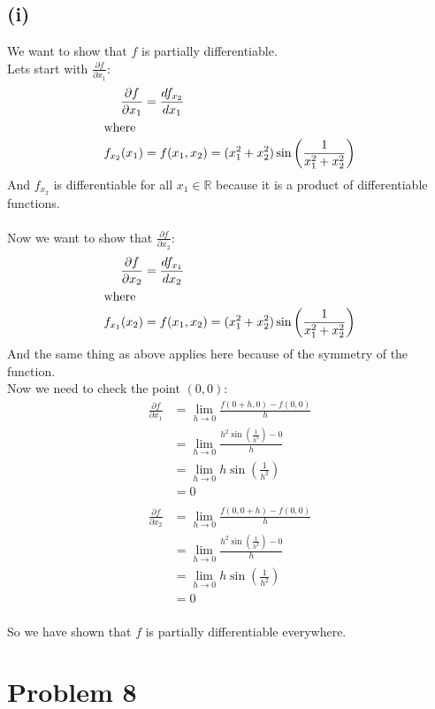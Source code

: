 \documentclass{article}
\begin{document}
\subsection*{(i)}
We want to show that \(f\) is partially differentiable. \\
Lets start with \(\frac{\partial f}{\partial x_1}\):
\begin{align*}
   \frac{\partial f}{\partial x_1} &= \frac{df_{x_2}}{dx_1} \\
   \intertext{where}
   f_{x_2}(x_1) &= f(x_1, x_2) = (x_1^2 + x_2^2) \sin\left(\frac{1}{x_1^2 + x_2^2}\right)
\end{align*}
And \(f_{x_2}\) is differentiable for all \(x_1 \in \mathbb{R}\) because it is a product of differentiable functions. \\
\\
Now we want to show that \(\frac{\partial f}{\partial x_2}\):
\begin{align*}
   \frac{\partial f}{\partial x_2} &= \frac{df_{x_1}}{dx_2} \\
   \intertext{where}
   f_{x_1}(x_2) &= f(x_1, x_2) = (x_1^2 + x_2^2) \sin\left(\frac{1}{x_1^2 + x_2^2}\right)
\end{align*}
And the same thing as above applies here because of the symmetry of the function. \\
Now we need to check the point \((0,0)\):
\begin{align*}
   \frac{\partial f}{\partial x_1} &= \lim_{h \to 0} \frac{f(0 + h, 0) - f(0, 0)}{h} \\
   &= \lim_{h \to 0} \frac{h^2 \sin\left(\frac{1}{h^2}\right) - 0}{h} \\
   &= \lim_{h \to 0} h \sin\left(\frac{1}{h^2}\right) \\
   &= 0 \\
\end{align*}
\begin{align*}
   \frac{\partial f}{\partial x_2} &= \lim_{h \to 0} \frac{f(0, 0 + h) - f(0, 0)}{h} \\
   &= \lim_{h \to 0} \frac{h^2 \sin\left(\frac{1}{h^2}\right) - 0}{h} \\
   &= \lim_{h \to 0} h \sin\left(\frac{1}{h^2}\right) \\
   &= 0 \\
\end{align*}

So we have shown that \(f\) is partially differentiable everywhere.

\section*{Problem 8}
\end{document}
